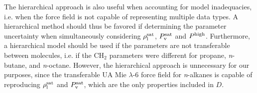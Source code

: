 \documentclass[preprint,letterpaper,floatfix,citeautoscript,aip,jcp]{revtex4-1}
\begin{document}
The hierarchical approach is also useful when accounting for model inadequacies, i.e. when the force field is not capable of representing multiple data types. A hierarchical method should thus be favored if determining the parameter uncertainty when simultaneously considering $\rho_{\rm l}^{\rm sat}$, $P_{\rm v}^{\rm sat}$ and $P^{\rm high}$. Furthermore, a hierarchical model should be used if the parameters are not transferable between molecules, i.e. if the CH$_2$ parameters were different for propane, \textit{n}-butane, and \textit{n}-octane. However, the hierarchical approach is unnecessary for our purposes, since the transferable UA Mie $\lambda$-6 force field for \textit{n}-alkanes is capable of reproducing $\rho_{\rm l}^{\rm sat}$ and $P_{\rm v}^{\rm sat}$, which are the only properties included in $D$. 






\end{document}
